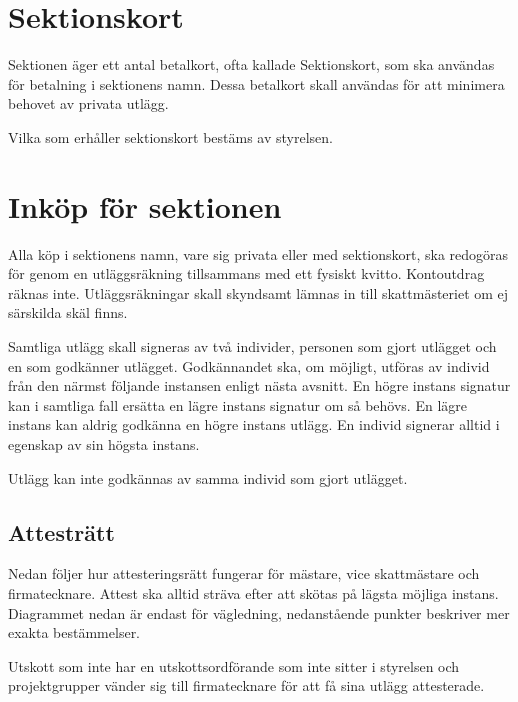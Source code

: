 \documentclass{dsekprotokoll}
\begin{document}
\section{Sektionskort}
Sektionen äger ett antal betalkort, ofta kallade Sektionskort, som ska användas för betalning i
sektionens namn. Dessa betalkort skall användas för att minimera behovet av privata utlägg.

Vilka som erhåller sektionskort bestäms av styrelsen.

\section{Inköp för sektionen}
Alla köp i sektionens namn, vare sig privata eller med sektionskort, ska
redogöras för genom en utläggsräkning tillsammans med ett fysiskt
kvitto. Kontoutdrag räknas inte. Utläggsräkningar skall skyndsamt lämnas in till
skattmästeriet om ej särskilda skäl finns.

Samtliga utlägg skall signeras av två individer, personen som gjort utlägget och
en som godkänner utlägget. Godkännandet ska, om möjligt, utföras av individ
från den närmst följande instansen enligt nästa avsnitt. En högre instans
signatur kan i samtliga fall ersätta en lägre instans signatur om så
behövs. En lägre instans kan aldrig godkänna en högre instans utlägg. En individ
signerar alltid i egenskap av sin högsta instans.

Utlägg kan inte godkännas av samma individ som gjort utlägget.

\subsection{Attesträtt}
Nedan följer hur attesteringsrätt fungerar för mästare, vice skattmästare och
firmatecknare.  Attest ska alltid sträva efter att skötas på lägsta möjliga
instans. Diagrammet nedan är endast för vägledning, nedanstående punkter
beskriver mer exakta bestämmelser.

Utskott som inte har en utskottsordförande som inte sitter i styrelsen och
projektgrupper vänder sig till firmatecknare för att få sina utlägg
attesterade.
\end{document}
